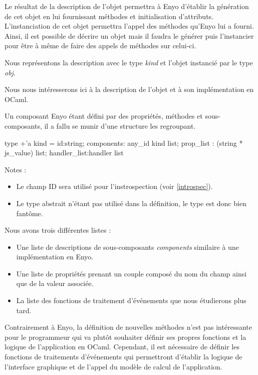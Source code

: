 \documentclass[11pt,a4paper]{report}
\begin{document}
Le résultat de la description de l'objet permettra à Enyo d'établir la génération de cet objet en lui
fournissant méthodes et initialisation d'attributs. L'instanciation de cet objet permettra l'appel
des méthodes qu'Enyo lui a fourni. Ainsi, il est possible de décrire un objet mais il faudra
le générer puis l'instancier pour être à même de faire des appels de méthodes sur celui-ci.

Nous représentons la description avec le type \emph{kind} et l'objet instancié par le type \emph{obj}.

Nous nous intéresserons ici à la description de l'objet et à son implémentation en OCaml.

Un composant Enyo étant défini par des propriétés, méthodes et sous-composants, il a fallu se munir
d'une structure les regroupant.
\begin{OCaml}
  type +'a kind = {id:string; 
                   components: any_id kind list; 
                   prop_list : (string * js_value) list;
                   handler_list:handler list
                  }
\end{OCaml}

Notes : 
\begin{itemize}
  \item Le champ ID sera utilisé pour l'instrospection (voir \ref{introspec}).
  \item Le type abstrait n'étant pas utilisé dans la définition, le type est donc bien
    fantôme.
\end{itemize}\medskip

Nous avons trois différentes listes :
\begin{itemize}
\item Une liste de descriptions de sous-composants \emph{components} similaire à
  une implémentation en Enyo.
\item Une liste de propriétés prenant un couple composé du nom du champ ainsi 
  que de la valeur associée.
\item La liste des fonctions de traitement d'événements que nous étudierons plus tard.
\end{itemize}

Contrairement à Enyo, la définition de nouvelles méthodes n'est pas intéressante pour le programmeur
qui va plutôt souhaiter définir ses propres fonctions et la logique de l'application en OCaml.
Cependant, il est nécessaire de définir les fonctions de traitements d'événements qui permettront
d'établir la logique de l'interface graphique et de l'appel du modèle de calcul de l'application.
\end{document}
